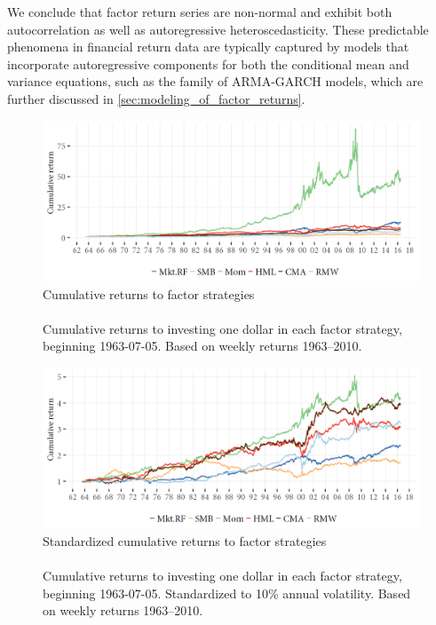 We conclude that factor return series are non-normal and exhibit both autocorrelation as well as autoregressive heteroscedasticity. These predictable phenomena in financial return data are typically captured by models that incorporate autoregressive components for both the conditional mean and variance equations, such as the family of ARMA-GARCH models, which are further discussed in \autoref{sec:modeling_of_factor_returns}.
\begin{figure}[htbp]
  \centering
  \footnotesize
  \renewcommand{\arraystretch}{1.2}
  \caption{Cumulative returns to factor strategies \\ \quad \\ 
  Cumulative returns to investing one dollar in each factor strategy, beginning 1963-07-05. Based on weekly returns 1963--2010.}
  \label{fig:cumret}
  \includegraphics[scale=1]{graphics/cumretPlot.png}  
\end{figure}
\begin{figure}[htbp]
  \centering
  \footnotesize
  \renewcommand{\arraystretch}{1.2}
  \caption{Standardized cumulative returns to factor strategies \\ \quad \\ 
  Cumulative returns to investing one dollar in each factor strategy, beginning 1963-07-05. Standardized to 10\% annual volatility. Based on weekly returns 1963--2010.}
  \label{fig:cumretstd}
  \includegraphics[scale=1]{graphics/cumretStdPlot.png}  
\end{figure}

